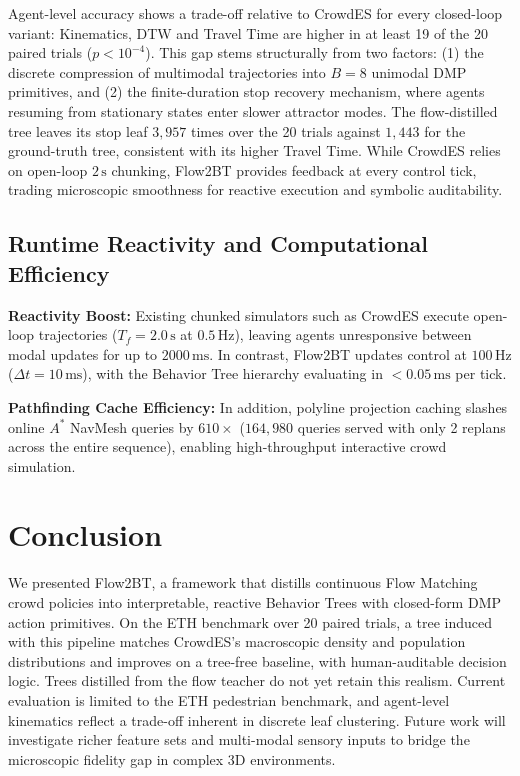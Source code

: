 \documentclass{sice-si}
\begin{document}
Agent-level accuracy shows a trade-off relative to CrowdES for every closed-loop variant: Kinematics, DTW and Travel Time are higher in at least 19 of the 20 paired trials ($p < 10^{-4}$). This gap stems structurally from two factors: (1) the discrete compression of multimodal trajectories into $B=8$ unimodal DMP primitives, and (2) the finite-duration stop recovery mechanism, where agents resuming from stationary states enter slower attractor modes. The flow-distilled tree leaves its stop leaf $3{,}957$ times over the 20 trials against $1{,}443$ for the ground-truth tree, consistent with its higher Travel Time. While CrowdES relies on open-loop $2\,\text{s}$ chunking, Flow2BT provides feedback at every control tick, trading microscopic smoothness for reactive execution and symbolic auditability.

\subsection{Runtime Reactivity and Computational Efficiency}
\textbf{Reactivity Boost:} 
Existing chunked simulators such as CrowdES execute open-loop trajectories ($T_f = 2.0\,\text{s}$ at $0.5\,\text{Hz}$), leaving agents unresponsive between modal updates for up to $2000\,\text{ms}$. In contrast, Flow2BT updates control at $100\,\text{Hz}$ ($\Delta t = 10\,\text{ms}$), with the Behavior Tree hierarchy evaluating in $< 0.05\,\text{ms}$ per tick.

\textbf{Pathfinding Cache Efficiency:}
In addition, polyline projection caching slashes online $A^*$ NavMesh queries by $610\times$ ($164,980$ queries served with only 2 replans across the entire sequence), enabling high-throughput interactive crowd simulation.

\section{Conclusion}
We presented Flow2BT, a framework that distills continuous Flow Matching crowd policies into interpretable, reactive Behavior Trees with closed-form DMP action primitives. On the ETH benchmark over 20 paired trials, a tree induced with this pipeline matches CrowdES's macroscopic density and population distributions and improves on a tree-free baseline, with human-auditable decision logic. Trees distilled from the flow teacher do not yet retain this realism. Current evaluation is limited to the ETH pedestrian benchmark, and agent-level kinematics reflect a trade-off inherent in discrete leaf clustering. Future work will investigate richer feature sets and multi-modal sensory inputs to bridge the microscopic fidelity gap in complex 3D environments.

\end{document}
